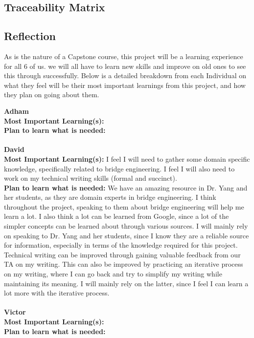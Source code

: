 \documentclass[12pt]{article}
\begin{document}
\subsection{Traceability Matrix}

\subsection{Reflection}

As is the nature of a Capstone course, this project will be a learning experience for all 6 of us. we will all have to learn new skills and improve on old ones to see this 
through successfully. Below is a detailed breakdown from each Individual on what they feel will be their most important learnings from this project, and how they plan on
going about them.

\noindent\textbf{Adham}\\
\textbf{Most Important Learning(s):}\\
\textbf{Plan to learn what is needed:}\\\\

\noindent\textbf{David}\\
\textbf{Most Important Learning(s):} I feel I will need to gather some domain specific knowledge, specifically related to bridge engineering. 
I feel I will also need to work on my technical writing skills (formal and succinct). \\
\textbf{Plan to learn what is needed:} We have an amazing resource in Dr. Yang and her students, as they are domain experts in bridge engineering. I think throughout the 
project, speaking to them about bridge engineering will help me learn a lot. I also think a lot can be learned from Google, since a lot of the simpler concepts can be learned 
about through various sources. I will mainly rely on speaking to Dr. Yang and her students, since I know they are a reliable source for information, especially in terms of 
the knowledge required for this project. Technical writing can be improved through gaining valuable feedback from our TA on my writing. This can also be improved
by practicing an iterative process on my writing, where I can go back and try to simplify my writing while maintaining its meaning. I will mainly rely on the latter, since 
I feel I can learn a lot more with the iterative process.\\\\

\noindent\textbf{Victor}\\
\textbf{Most Important Learning(s):}\\
\textbf{Plan to learn what is needed:}\\\\
\end{document}
